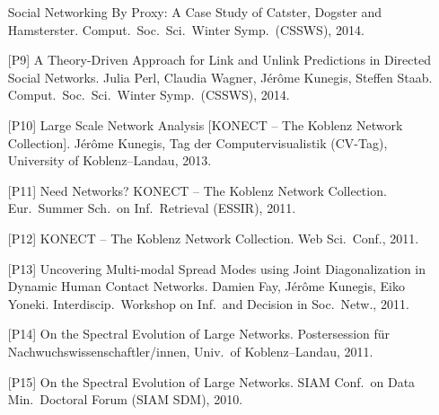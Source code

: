 \documentclass[line,mm]{res}
\newcounter{x}
\newcounter{y}
\begin{document}
\begin{resume}
\begin{itemize}
    Social Networking By Proxy: A Case Study of Catster, Dogster and
    Hamsterster. Comput.\ Soc.\ Sci.\ Winter
    Symp.\ (CSSWS), 2014.
  \item[{[P9]}] 
    A Theory-Driven Approach for Link and Unlink Predictions in
    Directed Social Networks. Julia Perl, Claudia Wagner, Jérôme
    Kunegis, Steffen Staab.  Comput.\ Soc.\ Sci.\ Winter
    Symp.\ (CSSWS), 2014.
  \item[{[P10]}]
    Large Scale Network Analysis [KONECT -- The Koblenz Network Collection].
    Jérôme Kunegis,
    Tag der Computervisualistik (CV-Tag), University of Koblenz--Landau, 2013. 
  \item[{[P11]}]
    Need Networks? KONECT -- The Koblenz Network Collection.
    Eur.\ Summer Sch.\ on Inf.\ Retrieval (ESSIR), 2011. 
  \item[{[P12]}]
    KONECT -- The Koblenz Network Collection. Web Sci.\ Conf., 2011. 
  \item[{[P13]}]
    Uncovering Multi-modal Spread Modes using Joint 
    Diagonalization in Dynamic Human Contact Networks. 
    Damien Fay, Jérôme Kunegis, Eiko Yoneki.  Interdiscip.\ Workshop on Inf.\ and Decision in Soc.\ Netw., 2011. 
  \item[{[P14]}]
    On the Spectral Evolution of Large Networks. Postersession 
    für Nachwuchswissenschaftler/innen, Univ.\ of Koblenz--Landau,
    2011. 
  \item[{[P15]}]
    On the Spectral Evolution of Large Networks. SIAM 
    Conf.\ on Data Min.\ Doctoral Forum (SIAM SDM), 2010. 
\end{itemize}


\end{resume}
\end{document}
